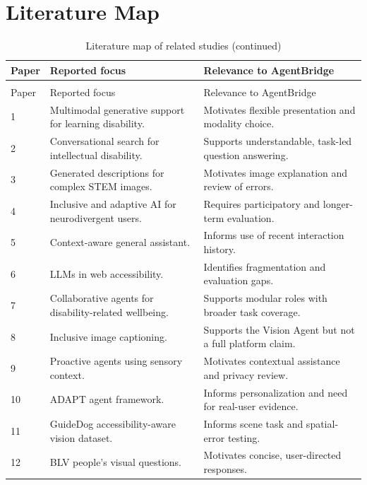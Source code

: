 \documentclass[12pt,a4paper,oneside]{report}
\begin{document}
\chapter{Literature Map}
\begingroup\small{}
\begin{longtable}{@{}p{}p{}p{}@{}}
\caption{Literature map of related studies}\label{tab:literaturemap}\\
\toprule Paper & Reported focus & Relevance to AgentBridge\\\midrule\endfirsthead
\caption[]{Literature map of related studies (continued)}\\
\toprule Paper & Reported focus & Relevance to AgentBridge\\\midrule\endhead
1 \cite{rajagopal} & Multimodal generative support for learning disability. & Motivates flexible presentation and modality choice.\\
2 \cite{roomkham} & Conversational search for intellectual disability. & Supports understandable, task-led question answering.\\
3 \cite{pedemonte} & Generated descriptions for complex STEM images. & Motivates image explanation and review of errors.\\
4 \cite{xu} & Inclusive and adaptive AI for neurodivergent users. & Requires participatory and longer-term evaluation.\\
5 \cite{kavitha} & Context-aware general assistant. & Informs use of recent interaction history.\\
6 \cite{aljedaani} & LLMs in web accessibility. & Identifies fragmentation and evaluation gaps.\\
7 \cite{jan} & Collaborative agents for disability-related wellbeing. & Supports modular roles with broader task coverage.\\
8 \cite{zatserkovnyi} & Inclusive image captioning. & Supports the Vision Agent but not a full platform claim.\\
9 \cite{yang} & Proactive agents using sensory context. & Motivates contextual assistance and privacy review.\\
10 \cite{siddiqui} & ADAPT agent framework. & Informs personalization and need for real-user evidence.\\
11 \cite{kim} & GuideDog accessibility-aware vision dataset. & Informs scene task and spatial-error testing.\\
12 \cite{penuela} & BLV people's visual questions. & Motivates concise, user-directed responses.\\

\end{longtable}
\end{document}
